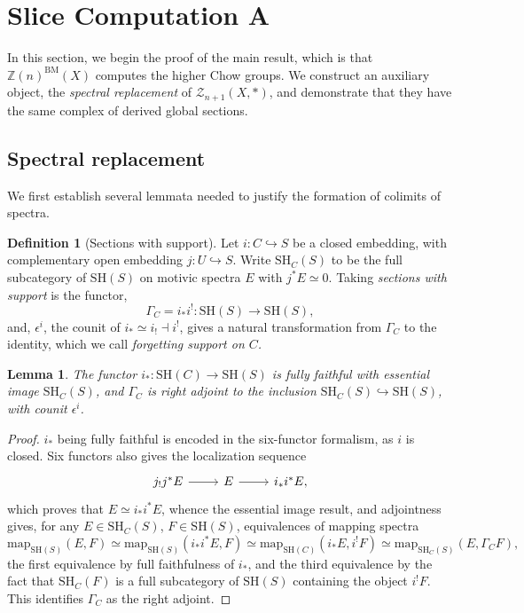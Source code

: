 \documentclass[11pt, twoside]{article}
\numberwithin{equation}{section}
\newtheorem{lemma}[equation]{Lemma}
\theoremstyle{definition}
\newtheorem{definition}[equation]{Definition}
\newcommand{\bb}[1]{\mathbb{#1}}
\newcommand{\map}{\mathrm{map}}
\newcommand{\sh}{\mathrm{SH}}
\newcommand{\bm}{\mathrm{BM}}
\begin{document}
\section{Slice Computation A}\label{slice-comp-A}
In this section, we begin the proof of the main result, which is that \(\bb{Z}(n)^\bm(X)\) computes the higher Chow groups. We construct an auxiliary object, the \emph{spectral replacement} of \(\mathcal{Z}_{n + 1}(X, *)\), and demonstrate that they have the same complex of derived global sections.

\subsection{Spectral replacement}

We first establish several lemmata needed to justify the formation of colimits of spectra.

\begin{definition}[Sections with support]
Let \(i \colon C \hookrightarrow S\) be a closed embedding, with complementary open embedding \(j \colon U \hookrightarrow S\). Write \(\sh_C(S)\) to be the full subcategory of \(\sh(S)\) on motivic spectra \(E\) with \(j^*E \simeq 0\). Taking \emph{sections with support} is the functor, 
\[\Gamma_C = i_*i^! \colon \sh(S) \to \sh(S),\]
and, \(\epsilon^i\), the counit of \(i_* \simeq i_! \dashv i^!\), gives a natural transformation from \(\Gamma_C\) to the identity, which we call \emph{forgetting support on \(C\).}
\end{definition}

\begin{lemma}
The functor \(i_* \colon \sh(C) \to \sh(S)\) is fully faithful with essential image \(\sh_C(S)\), and \(\Gamma_C\) is right adjoint to the inclusion \(\sh_C(S) \hookrightarrow \sh(S)\), with counit \(\epsilon^i\).
\end{lemma}

\begin{proof}
\(i_*\) being fully faithful is encoded in the six-functor formalism, as \(i\) is closed. Six functors also gives the localization sequence  
\[\begin{tikzcd}
j_!j^*E \ar[r] & E \ar[r] & i_*i^*E,
\end{tikzcd}\]
which proves that \(E \simeq i_*i^*E\), whence the essential image result, and adjointness gives, for any \(E \in \sh_C(S)\), \(F \in \sh(S)\), equivalences of mapping spectra 
\[\map_{\sh(S)}(E, F) \simeq \map_{\sh(S)}(i_*i^*E, F) \simeq \map_{\sh(C)}(i_*E, i^!F) \simeq \map_{\sh_C(S)}(E, \Gamma_C F),\]
the first equivalence by full faithfulness of \(i_*\), and the third equivalence by the fact that \(\sh_C(F)\) is a full subcategory of \(\sh(S)\) containing the object \(i^!F\). This identifies \(\Gamma_C\) as the right adjoint.
\end{proof}
\end{document}
